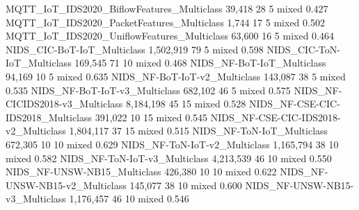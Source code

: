 MQTT_IoT_IDS2020_BiflowFeatures_Multiclass                               39,418       28       5         mixed   0.427
MQTT_IoT_IDS2020_PacketFeatures_Multiclass                                1,744       17       5         mixed   0.502
MQTT_IoT_IDS2020_UniflowFeatures_Multiclass                              63,600       16       5         mixed   0.464
NIDS_CIC-BoT-IoT_Multiclass                                           1,502,919       79       5         mixed   0.598
NIDS_CIC-ToN-IoT_Multiclass                                             169,545       71      10         mixed   0.468
NIDS_NF-BoT-IoT_Multiclass                                               94,169       10       5         mixed   0.635
NIDS_NF-BoT-IoT-v2_Multiclass                                           143,087       38       5         mixed   0.535
NIDS_NF-BoT-IoT-v3_Multiclass                                           682,102       46       5         mixed   0.575
NIDS_NF-CICIDS2018-v3_Multiclass                                      8,184,198       45      15         mixed   0.528
NIDS_NF-CSE-CIC-IDS2018_Multiclass                                      391,022       10      15         mixed   0.545
NIDS_NF-CSE-CIC-IDS2018-v2_Multiclass                                 1,804,117       37      15         mixed   0.515
NIDS_NF-ToN-IoT_Multiclass                                              672,305       10      10         mixed   0.629
NIDS_NF-ToN-IoT-v2_Multiclass                                         1,165,794       38      10         mixed   0.582
NIDS_NF-ToN-IoT-v3_Multiclass                                         4,213,539       46      10         mixed   0.550
NIDS_NF-UNSW-NB15_Multiclass                                            426,380       10      10         mixed   0.622
NIDS_NF-UNSW-NB15-v2_Multiclass                                         145,077       38      10         mixed   0.600
NIDS_NF-UNSW-NB15-v3_Multiclass                                       1,176,457       46      10         mixed   0.546
